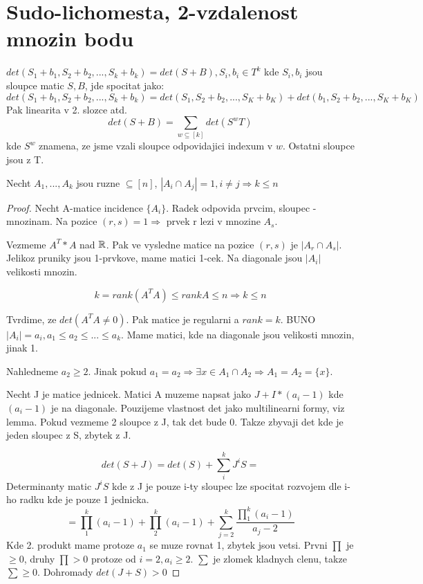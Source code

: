 \section{\texorpdfstring{Sudo-lichomesta, 2-vzdalenost mnozin bodu}{Sudo-lichomesta, 2-vzdalenost mnozin bodu}}
\vspace{5mm}
\large


\begin{lemma}
	$det(S_1 + b_1, S_2 + b_2 , ... , S_k + b_k) = det(S + B), S_i, b_i \in T^k$ kde $S_i,b_i$ jsou sloupce matic $S, B$, jde spocitat jako:
	\[ det(S_1 + b_1, S_2 + b_2 , ... , S_k + b_k) = det(S_1, S_2 + b_2 , ... , S_K + b_K) + det(b_1, S_2 + b_2 , ... , S_K + b_K) \]
	Pak linearita v 2. slozce atd.
	\[ det(S + B) = \sum_{w \subseteq [k]} det(S^wT) \]
	kde $S^w$ znamena, ze jsme vzali sloupce odpovidajici indexum v $w$. Ostatni sloupce jsou z T.
\end{lemma}


\begin{theorem}
	Necht $A_1, ... , A_k$ jsou ruzne $ \subseteq [n]$, $ |A_i \cap A_j| = 1, i \ne j \Rightarrow k \leq n$
\end{theorem}
\begin{proof}
	Necht A-matice incidence $\{A_i\}$. Radek odpovida prvcim, sloupec - mnozinam. Na pozice $(r,s) = 1 \Rightarrow$ prvek r lezi v mnozine $A_s$.

	Vezmeme $A^T * A$ nad $\operatorname{\mathbb{R}}$. Pak ve vysledne matice na pozice $(r,s)$ je $|A_r \cap A_s|$. Jelikoz pruniky jsou 1-prvkove, mame matici 1-cek. Na diagonale jsou $|A_i|$ velikosti mnozin.

	\[ k = rank(A^TA) \leq rank A \leq n \Rightarrow k \leq n \]

	Tvrdime, ze $det(A^TA \ne 0)$. Pak matice je regularni a $rank = k$.
	BUNO $|A_i| = a_i, a_1 \leq a_2 \leq ... \leq a_k$. Mame matici, kde na diagonale jsou velikosti mnozin, jinak 1.

	Nahledneme $a_2 \geq 2$. Jinak pokud $a_1 = a_2 \Rightarrow \exists x \in A_1 \cap A_2 \Rightarrow A_1 = A_2 = \{ x \} $.

	Necht J je matice jednicek. Matici A muzeme napsat jako $J + I*(a_i - 1)$ kde $(a_i - 1)$ je na diagonale.
	Pouzijeme vlastnost det jako multilinearni formy, viz lemma. Pokud vezmeme 2 sloupce z J, tak det bude 0. Takze zbyvaji det kde je jeden sloupec z S, zbytek z J.

	\[ det(S + J) = det(S) + \sum_i^k J^iS = \]
	Determinanty matic $J^iS$ kde z J je pouze i-ty sloupec lze spocitat rozvojem dle i-ho radku kde je pouze 1 jednicka.
	\[ = \prod_1^k (a_i - 1) + \prod_2^k (a_i - 1) + \sum_{j=2}^k \frac{\prod_1^k (a_i - 1)}{a_j - 2} \]
	Kde 2. produkt mame protoze $a_1$ se muze rovnat 1, zbytek jsou vetsi. Prvni $\prod$ je $\geq 0$, druhy $\prod > 0$ protoze od $i = 2, a_i \geq 2$. $\sum$ je zlomek kladnych clenu, takze $\sum \geq 0$. Dohromady $ det(J + S) > 0$

\end{proof}


